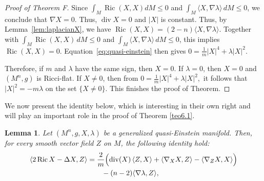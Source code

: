 \documentclass[a4paper, 12pt]{amsart}
\DeclareMathOperator{\Ric}{Ric}
\newtheorem{lemma}[theorem]{Lemma}
\theoremstyle{definition}
\numberwithin{figure}{section}
\begin{document}
\begin{proof}[Proof of Theorem F]
Since $\int_M \operatorname{Ric}(X,X) dM \le 0$ and
$\int_M \langle X,\nabla \lambda\rangle\, dM \le 0$, we conclude that
$\nabla X =0$. Thus, $\operatorname{div} X =0$ and $|X|$ is constant. Thus, by Lemma~\ref{lem:laplacianX}, we have
$\operatorname{Ric}(X,X) = (2-n)\langle X,\nabla\lambda\rangle$.
Together with
$\int_M \operatorname{Ric}(X,X)\,dM \le 0$ and
$\int_M \langle X,\nabla\lambda\rangle\,dM \le 0$,
this implies $\operatorname{Ric}(X,X)=0$.
Equation~\eqref{eq:quasi-einstein} then gives
$
0=\frac{1}{m}|X|^{4}+\lambda|X|^{2}.
$

Therefore, if $m$ and $\lambda$ have the same sign, then $X=0$.
If $\lambda=0$, then $X=0$ and $(M^n,g)$ is Ricci-flat.
If \(X\not=0\), then from
$
0=\frac{1}{m}|X|^{4}+\lambda|X|^{2},
$
it follows that
$
|X|^{2}=-m\lambda
$
on the set \(\{X\neq0\}\). This finishes the proof of Theorem. 
\end{proof}

We now present the identity below, which is interesting in their own right and will play an important role in the proof of Theorem \ref{teo6.1}.

\begin{lemma}\label{eq10}
Let $(M^n,g,X,\lambda)$ be a generalized quasi-Einstein manifold. Then, for every smooth vector field $Z$ on $M$, the following identity hold:
\begin{align}
\langle 2\Ric X - \Delta X,Z\rangle
&=
\frac{2}{m}\Bigl(
\operatorname{div}(X)\,\langle Z,X\rangle
+\langle \nabla_XX,Z\rangle
-\langle \nabla_ZX,X\rangle
\Bigr) \notag\\
&\qquad
-(n-2)\langle \nabla\lambda,Z\rangle, \label{neweq10.1}
\end{align}
\end{lemma}
\end{document}
